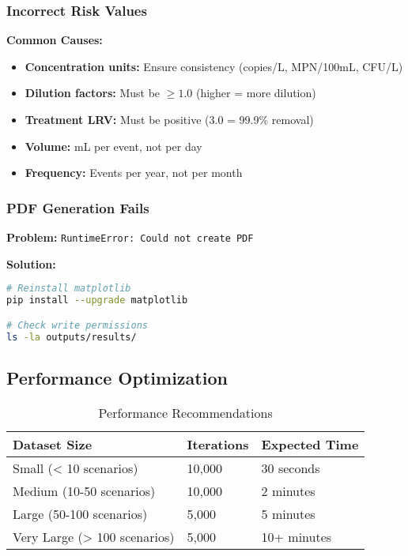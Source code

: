 \documentclass[11pt,a4paper]{article}
\begin{document}
\subsubsection{Incorrect Risk Values}

\textbf{Common Causes:}
\begin{itemize}[leftmargin=*]
    \item \textbf{Concentration units:} Ensure consistency (copies/L, MPN/100mL, CFU/L)
    \item \textbf{Dilution factors:} Must be $\ge 1.0$ (higher = more dilution)
    \item \textbf{Treatment LRV:} Must be positive (3.0 = 99.9\% removal)
    \item \textbf{Volume:} mL per event, not per day
    \item \textbf{Frequency:} Events per year, not per month
\end{itemize}

\subsubsection{PDF Generation Fails}

\textbf{Problem:} \texttt{RuntimeError: Could not create PDF}

\textbf{Solution:}
\begin{lstlisting}[style=bashstyle, language=bash]
# Reinstall matplotlib
pip install --upgrade matplotlib

# Check write permissions
ls -la outputs/results/
\end{lstlisting}

\subsection{Performance Optimization}

\begin{table}[H]
\centering
\caption{Performance Recommendations}
\begin{tabular}{lll}
\toprule
\textbf{Dataset Size} & \textbf{Iterations} & \textbf{Expected Time} \\
\midrule
Small (< 10 scenarios) & 10,000 & 30 seconds \\
Medium (10-50 scenarios) & 10,000 & 2 minutes \\
Large (50-100 scenarios) & 5,000 & 5 minutes \\
Very Large (> 100 scenarios) & 5,000 & 10+ minutes \\
\bottomrule
\end{tabular}
\end{table}
\end{document}
